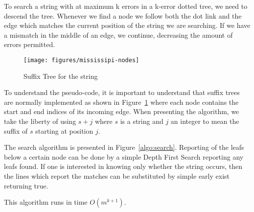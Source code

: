 To search a string with at maximum k errors in a k-error dotted tree, we need to descend the tree. Whenever we find a node we follow both the dot link and the edge which matches the current position of the string we are searching. If we have a mismatch in the middle of an edge, we continue, decreasing the amount of errors permitted.

\begin{figure}
\texttt{[image: figures/mississipi-nodes]}
\caption{Suffix Tree for the string }%
\label{fig:mississipi-nodes}
\end{figure}

To understand the pseudo-code, it is important to understand that suffix trees are normally implemented as shown in Figure~\ref{fig:mississipi-nodes} where each node contains the start and end indices of its incoming edge. When presenting the algorithm, we take the liberty of using $s+j$ where $s$ is a string and $j$ an integer to mean the suffix of $s$ starting at position $j$.



The search algorithm is presented in Figure~\ref{algo:search}. Reporting of the leafs below a certain node can be done by a simple Depth First Search reporting any leafs found. If one is interested in knowing only whether the string occurs, then the lines which report the matches can be substituted by simple early exist returning true.

This algorithm runs in time $O(m^{k+1})$. 
